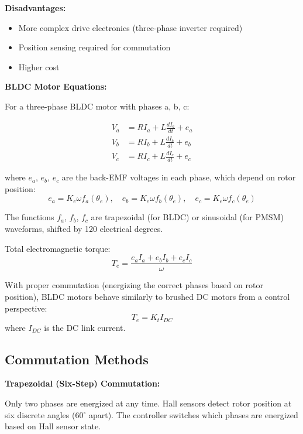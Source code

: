 \textbf{Disadvantages:}
\begin{itemize}
    \item More complex drive electronics (three-phase inverter required)
    \item Position sensing required for commutation
    \item Higher cost
\end{itemize}

\textbf{BLDC Motor Equations:}

For a three-phase BLDC motor with phases a, b, c:

\begin{equation}
    \begin{aligned}
        V_a &= R I_a + L \frac{dI_a}{dt} + e_a \\
        V_b &= R I_b + L \frac{dI_b}{dt} + e_b \\
        V_c &= R I_c + L \frac{dI_c}{dt} + e_c
    \end{aligned}
\end{equation}

where $e_a$, $e_b$, $e_c$ are the back-EMF voltages in each phase, which depend on rotor position:
\begin{equation}
    e_a = K_e \omega f_a(\theta_e), \quad e_b = K_e \omega f_b(\theta_e), \quad e_c = K_e \omega f_c(\theta_e)
\end{equation}

The functions $f_a$, $f_b$, $f_c$ are trapezoidal (for BLDC) or sinusoidal (for PMSM) waveforms, shifted by 120 electrical degrees.

Total electromagnetic torque:
\begin{equation}
    T_e = \frac{e_a I_a + e_b I_b + e_c I_c}{\omega}
\end{equation}

With proper commutation (energizing the correct phases based on rotor position), BLDC motors behave similarly to brushed DC motors from a control perspective:
\begin{equation}
    T_e = K_t I_{DC}
\end{equation}
where $I_{DC}$ is the DC link current.

\subsection{Commutation Methods}

\textbf{Trapezoidal (Six-Step) Commutation:}

Only two phases are energized at any time. Hall sensors detect rotor position at six discrete angles (60$^\circ$ apart). The controller switches which phases are energized based on Hall sensor state.

